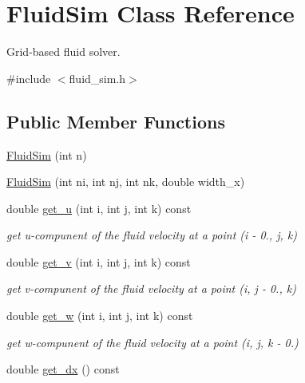\hypertarget{class_fluid_sim}{}\section{Fluid\+Sim Class Reference}
\label{class_fluid_sim}


Grid-\/based fluid solver.  




{\ttfamily \#include $<$fluid\+\_\+sim.\+h$>$}

\subsection*{Public Member Functions}
\begin{DoxyCompactItemize}
\item 
\hyperlink{class_fluid_sim_a2a1b68493a7ad7652c5786dd56400ceb}{Fluid\+Sim} (int n)
\item 
\hyperlink{class_fluid_sim_a77a150bb73bcd7712d99e6f51d6c3f0c}{Fluid\+Sim} (int ni, int nj, int nk, double width\+\_\+x)
\item 
\hypertarget{class_fluid_sim_a571bf8b1dd6172731718e85a39ca1fba}{}double \hyperlink{class_fluid_sim_a571bf8b1dd6172731718e85a39ca1fba}{get\+\_\+u} (int i, int j, int k) const \label{class_fluid_sim_a571bf8b1dd6172731718e85a39ca1fba}

\begin{DoxyCompactList}\small\item\em get u-\/compunent of the fluid velocity at a point (i -\/ 0., j, k) \end{DoxyCompactList}\item 
\hypertarget{class_fluid_sim_a91ff8cfe3d198bc103564003dc15a862}{}double \hyperlink{class_fluid_sim_a91ff8cfe3d198bc103564003dc15a862}{get\+\_\+v} (int i, int j, int k) const \label{class_fluid_sim_a91ff8cfe3d198bc103564003dc15a862}

\begin{DoxyCompactList}\small\item\em get v-\/compunent of the fluid velocity at a point (i, j -\/ 0., k) \end{DoxyCompactList}\item 
\hypertarget{class_fluid_sim_a25a82545b4526320c4cd9bb2e8f809e0}{}double \hyperlink{class_fluid_sim_a25a82545b4526320c4cd9bb2e8f809e0}{get\+\_\+w} (int i, int j, int k) const \label{class_fluid_sim_a25a82545b4526320c4cd9bb2e8f809e0}

\begin{DoxyCompactList}\small\item\em get w-\/compunent of the fluid velocity at a point (i, j, k -\/ 0.) \end{DoxyCompactList}\item 
\hypertarget{class_fluid_sim_aca3aeb48eb4c34142c6547fa41525e0f}{}double \hyperlink{class_fluid_sim_aca3aeb48eb4c34142c6547fa41525e0f}{get\+\_\+dx} () const \label{class_fluid_sim_aca3aeb48eb4c34142c6547fa41525e0f}


\end{DoxyCompactItemize}
